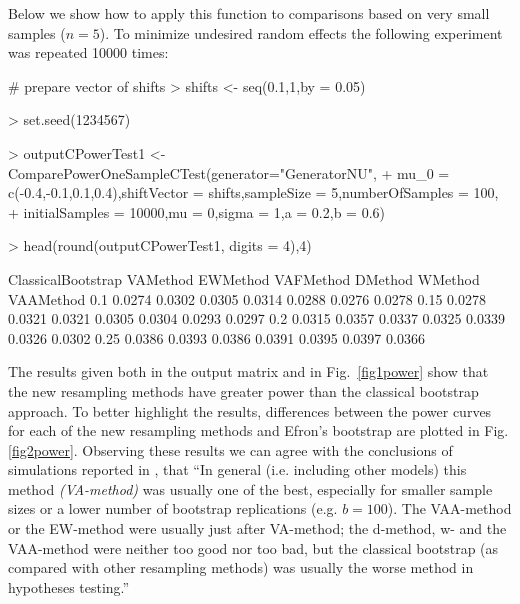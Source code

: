 Below we show how to apply this function to comparisons based on very small samples  ($n=5$). To minimize undesired random effects the following experiment was repeated 10000 times:
\begin{example}
# prepare vector of shifts
> shifts <- seq(0.1,1,by = 0.05)

> set.seed(1234567)

> outputCPowerTest1 <- ComparePowerOneSampleCTest(generator="GeneratorNU",
+ mu_0 = c(-0.4,-0.1,0.1,0.4),shiftVector = shifts,sampleSize = 5,numberOfSamples = 100,
+ initialSamples = 10000,mu = 0,sigma = 1,a = 0.2,b = 0.6)

> head(round(outputCPowerTest1, digits = 4),4)

     ClassicalBootstrap VAMethod EWMethod VAFMethod DMethod WMethod VAAMethod
0.1              0.0274   0.0302   0.0305    0.0314  0.0288  0.0276    0.0278
0.15             0.0278   0.0321   0.0321    0.0305  0.0304  0.0293    0.0297
0.2              0.0315   0.0357   0.0337    0.0325  0.0339  0.0326    0.0302
0.25             0.0386   0.0393   0.0386    0.0391  0.0395  0.0397    0.0366
\end{example}
The results given both in the output matrix and in Fig.~\ref{fig1power} show that the new resampling methods have greater power than the classical bootstrap approach.
To better highlight the results, differences between the power curves for each of the new resampling methods and Efron's bootstrap are plotted in Fig. \ref{fig2power}.
Observing these results we can agree with the conclusions of simulations reported in \citep{GrzegorzewskiRom2021}, that ``In general (i.e. including other models) this method \emph{(VA-method)} was usually one of the best, especially for smaller sample sizes or a lower number of bootstrap replications (e.g.  $b=100$). The VAA-method or the EW-method were usually just after VA-method; the d-method, w- and the VAA-method were neither too good nor too bad, but the classical bootstrap (as compared with other resampling methods) was usually the worse method in hypotheses testing.''


